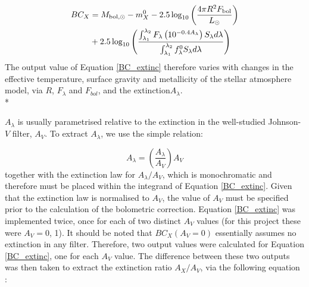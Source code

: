 \documentclass[12pt, a4paper]{report}
\begin{document}
\begin{align}
\begin{split}
BC_{X} &= M_{\textnormal{bol},\odot} - m_{X}^{0} - 2.5 \log_{10} \left( \frac{4\pi R^{2}F_{\textnormal{bol}}}{L_{\odot}} \right) \\
&+ 2.5 \log_{10} \left( \frac{\int_{\lambda_{1}}^{\lambda_{2}} F_{\lambda} \left( 10^{-0.4 A_{\lambda}} \right) S_{\lambda} d\lambda}{\int_{\lambda_{1}}^{\lambda_{2}} f_{\lambda}^{0} S_{\lambda} d\lambda} \right)
\label{BC_extinc}
\end{split}
\end{align}
The output value of Equation \ref{BC_extinc} therefore varies with changes in the effective temperature, surface gravity and metallicity of the stellar atmosphere model, via $R$, $F_{\lambda}$ and $F_{bol}$, and the extinction$ A_{\lambda}$.\\*


$A_{\lambda}$ is usually parametrised relative to the extinction in the well-studied Johnson-$V$ filter, $A_{V}$. To extract $A_{\lambda}$, we use the simple relation:

\begin{equation}
A_{\lambda} = \left( \frac{A_{\lambda}}{A_{V}} \right) A_{V}
\label{ratio_eq}
\end{equation}
together with the \cite{1989ApJ...345..245C} extinction law for $A_{\lambda}/A_{V}$, which is monochromatic and therefore must be placed within the integrand of Equation \ref{BC_extinc}. Given that the \cite{1989ApJ...345..245C} extinction law is normalised to $A_{V}$, the value of $A_{V}$ must be specified prior to the calculation of the bolometric correction. Equation \ref{BC_extinc} was implemented twice, once for each of two distinct $A_{V}$ values (for this project these were $A_{V} = 0$, 1). It should be noted that $BC_{X}(A_{V}=0)$ essentially assumes no extinction in any filter. Therefore, two output values were calculated for Equation \ref{BC_extinc}, one for each $A_{V}$ value. The difference between these two outputs was then taken to extract the extinction ratio $A_{X}/A_{V}$, via the following equation \citep{2008PASP..120..583G}:
\end{document}
